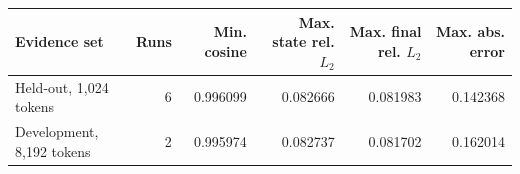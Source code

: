 \begin{tabular}{lrrrrr}
\toprule
Evidence set & Runs & Min. cosine & Max. state rel. $L_2$ & Max. final rel. $L_2$ & Max. abs. error \\
\midrule
Held-out, 1{,}024 tokens & 6 & 0.996099 & 0.082666 & 0.081983 & 0.142368 \\
Development, 8{,}192 tokens & 2 & 0.995974 & 0.082737 & 0.081702 & 0.162014 \\
\bottomrule
\end{tabular}
